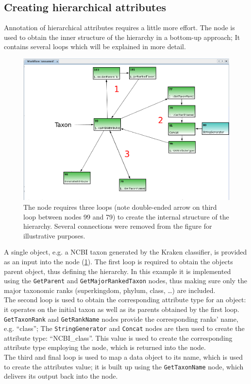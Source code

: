 \subsection{Creating hierarchical attributes}

Annotation of hierarchical attributes requires a little more effort. The  node
is used to obtain the inner structure of the hierarchy in a bottom-up approach; It contains several loops which
will be explained in more detail.

\begin{figure}[H]
\centering
\includegraphics[width=\textwidth]{img/conveyor/TreeAnnot}
\caption[Hierarchical attributes]{The  node requires three loops (note double-ended arrow on third loop between nodes 99 and 79)
to create the internal structure of the hierarchy. Several connections were removed from the figure
for illustrative purposes.}
\label{annot5}
\end{figure}

A single object, e.g. a NCBI taxon generated by the Kraken \cite{KRAKEN} classifier, is provided as an input
into the node (\ref{annot5}). 
The first loop is required to obtain the objects parent object, thus defining the hierarchy. In this example
it is implemented using the \texttt{GetParent} and \texttt{GetMajorRankedTaxon} nodes, thus making sure only
the major taxonomic ranks (superkingdom, phylum, class, \dots) are included.\\
The second loop is used to obtain the corresponding attribute type for an object: it operates on the initial taxon as well as its parents
obtained by the first loop. \texttt{GetTaxonRank} and \texttt{GetRankName} nodes provide the corresponding
ranks' name, e.g. ``class''; The \texttt{StringGenerator} and \texttt{Concat} nodes are then used to create the
attribute type: ``NCBI\_class''. This value is used to create the corresponding attribute type employing the
 node, which is returned into the  node.\\
The third and final loop is used to map a data object to its name, which is used to create the attributes value;
it is built up using the \texttt{GetTaxonName} node, which delivers its output back into the node.\\

